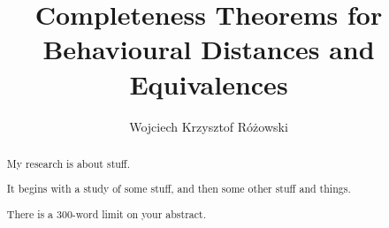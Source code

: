 
\title{Completeness Theorems for Behavioural Distances and Equivalences}
\author{Wojciech Krzysztof R\'{o}\.{z}owski}

\maketitle
\makedeclaration

\begin{abstract} %
My research is about stuff.

It begins with a study of some stuff, and then some other stuff and things.

There is a 300-word limit on your abstract.
\end{abstract}

